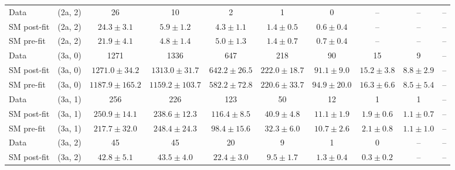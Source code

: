 \begin{table}[h!]
{\begin{tabular}{lccccccccc}
	Data        & (2a, 2)           & 26                   & 10                   & 2                  & 1                  & 0                  & --               & --               & --           \\[0.5ex] 
	SM post-fit & (2a, 2)           & $24.3\pm{ 3.1 }$     & $5.9\pm{ 1.2 }$      & $4.3\pm{ 1.1 }$    & $1.4\pm{ 0.5 }$    & $0.6\pm{ 0.4 }$    & --               & --               & --           \\[0.5ex] 
	SM pre-fit  & (2a, 2)           & $21.9\pm{ 4.1 }$     & $4.8\pm{ 1.4 }$      & $5.0\pm{ 1.3 }$    & $1.4\pm{ 0.7 }$    & $0.7\pm{ 0.4 }$    & --               & --               & --           \\[0.5ex] 
	Data        & (3a, 0)           & 1271                 & 1336                 & 647                & 218                & 90                 & 15               & 9                & --           \\[0.5ex] 
	SM post-fit & (3a, 0)           & $1271.0\pm{ 34.2 }$  & $1313.0\pm{ 31.7 }$  & $642.2\pm{ 26.5 }$ & $222.0\pm{ 18.7 }$ & $91.1\pm{ 9.0 }$   & $15.2\pm{ 3.8 }$ & $8.8\pm{ 2.9 }$  & --           \\[0.5ex] 
	SM pre-fit  & (3a, 0)           & $1187.9\pm{ 165.2 }$ & $1159.2\pm{ 103.7 }$ & $582.2\pm{ 72.8 }$ & $220.6\pm{ 33.7 }$ & $94.9\pm{ 20.0 }$  & $16.3\pm{ 6.6 }$ & $8.5\pm{ 5.4 }$  & --           \\[0.5ex] 
	Data        & (3a, 1)           & 256                  & 226                  & 123                & 50                 & 12                 & 1                & 1                & --           \\[0.5ex] 
	SM post-fit & (3a, 1)           & $250.9\pm{ 14.1 }$   & $238.6\pm{ 12.3 }$   & $116.4\pm{ 8.5 }$  & $40.9\pm{ 4.8 }$   & $11.1\pm{ 1.9 }$   & $1.9\pm{ 0.6 }$  & $1.1\pm{ 0.7 }$  & --           \\[0.5ex] 
	SM pre-fit  & (3a, 1)           & $217.7\pm{ 32.0 }$   & $248.4\pm{ 24.3 }$   & $98.4\pm{ 15.6 }$  & $32.3\pm{ 6.0 }$   & $10.7\pm{ 2.6 }$   & $2.1\pm{ 0.8 }$  & $1.1\pm{ 1.0 }$  & --           \\[0.5ex] 
	Data        & (3a, 2)           & 45                   & 45                   & 20                 & 9                  & 1                  & 0                & --               & --           \\[0.5ex] 
	SM post-fit & (3a, 2)           & $42.8\pm{ 5.1 }$     & $43.5\pm{ 4.0 }$     & $22.4\pm{ 3.0 }$   & $9.5\pm{ 1.7 }$    & $1.3\pm{ 0.4 }$    & $0.3\pm{ 0.2 }$  & --               & --           \\[0.5ex] 

\end{tabular}}
\end{table}
